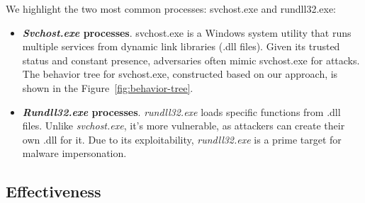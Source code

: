 We highlight the two most common processes: svchost.exe and rundll32.exe:
\begin{itemize}
    \item \textbf{\textit{Svchost.exe} processes}. svchost.exe is a Windows system utility that runs multiple services from dynamic link libraries (.dll files). Given its trusted status and constant presence, adversaries often mimic svchost.exe for attacks. The behavior tree for svchost.exe, constructed based on our approach, is shown in the Figure~\ref{fig:behavior-tree}.
    \item \textbf{\textit{Rundll32.exe} processes}. \textit{rundll32.exe} loads specific functions from .dll files. Unlike \textit{svchost.exe}, it's more vulnerable, as attackers can create their own .dll for it. Due to its exploitability, \textit{rundll32.exe} is a prime target for malware impersonation. 
\end{itemize}



\subsection{Effectiveness}
\label{sec-effective}

